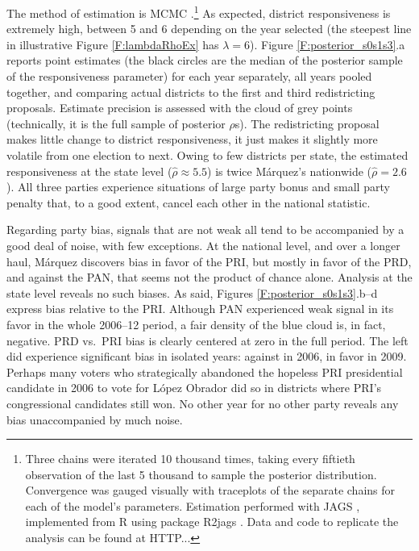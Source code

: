 \documentclass[letter,12pt]{article}
\begin{document}
The  method of estimation is MCMC \citep{jackman.2000}.\footnote{Three chains were iterated 10 thousand times, taking every fiftieth observation of the last 5 thousand to sample the posterior distribution. Convergence was gauged visually with traceplots of the separate chains for each of the model's parameters. Estimation performed with JAGS \citep{jags.cite}, implemented from R \citep{r.cite} using package R2jags \citep{r.r2jags}. Data and code to replicate the analysis can be found at HTTP...} As expected, district responsiveness is extremely high, between 5 and 6 depending on the year selected (the steepest line in illustrative Figure \ref{F:lambdaRhoEx} has $\lambda=6$). Figure \ref{F:posterior_s0s1s3}.a reports point estimates (the black circles are the median of the posterior sample of the responsiveness parameter) for each year separately, all years pooled together, and comparing actual districts to the first and third redistricting proposals. Estimate precision is assessed with the cloud of grey points (technically, it is the full sample of posterior $\rho$s). The redistricting proposal makes little change to district responsiveness, it just makes it slightly more volatile from one election to next. Owing to few districts per state, the estimated responsiveness at the state level ($\hat{\rho} \approx 5.5$) is twice M\'arquez's nationwide ($\hat{\rho} = 2.6$). All three parties experience situations of large party bonus and small party penalty that, to a good extent, cancel each other in the national statistic.

Regarding party bias, signals that are not weak all tend to be accompanied by a good deal of noise, with few exceptions. At the national level, and over a longer haul, M\'arquez discovers bias in favor of the PRI, but mostly in favor of the PRD, and against the PAN, that seems not the product of chance alone. Analysis at the state level reveals no such biases. As said, Figures \ref{F:posterior_s0s1s3}.b--d express bias relative to the PRI. Although PAN experienced weak signal in its favor in the whole 2006--12 period, a fair density of the blue cloud is, in fact, negative. PRD vs.\ PRI bias is clearly centered at zero in the full period. The left did experience significant bias in isolated years: against in 2006, in favor in 2009. Perhaps many voters who strategically abandoned the hopeless PRI presidential candidate in 2006 to vote for L\'opez Obrador did so in districts where PRI's congressional candidates still won. No other year for no other party reveals any bias unaccompanied by much noise.
\end{document}
